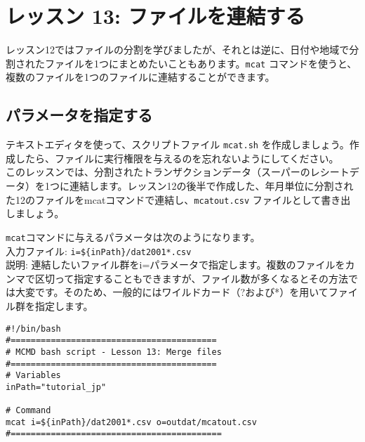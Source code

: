 

%

\section{レッスン 13: ファイルを連結する}

レッスン12ではファイルの分割を学びましたが、それとは逆に、日付や地域で分割されたファイルを1つにまとめたいこともあります。\verb|mcat| コマンドを使うと、複数のファイルを1つのファイルに連結することができます。

\subsection{パラメータを指定する}

テキストエディタを使って、スクリプトファイル \verb|mcat.sh| を作成しましょう。作成したら、ファイルに実行権限を与えるのを忘れないようにしてください。\\

このレッスンでは、分割されたトランザクションデータ（スーパーのレシートデータ）を1つに連結します。レッスン12の後半で作成した、年月単位に分割された12のファイルをmcatコマンドで連結し、\verb|mcatout.csv| ファイルとして書き出しましょう。


{\setlength{\parindent}{0cm}

\verb|mcat|コマンドに与えるパラメータは次のようになります。\\

入力ファイル: \verb|i=${inPath}/dat2001*.csv| \\
説明: 連結したいファイル群をi=パラメータで指定します。複数のファイルをカンマで区切って指定することもできますが、ファイル数が多くなるとその方法では大変です。そのため、一般的にはワイルドカード（?および*）を用いてファイル群を指定します。
}

\begin{verbatim}
#!/bin/bash
#=========================================
# MCMD bash script - Lesson 13: Merge files
#=========================================
# Variables
inPath="tutorial_jp"

# Command 
mcat i=${inPath}/dat2001*.csv o=outdat/mcatout.csv
#==========================================
\end{verbatim}

